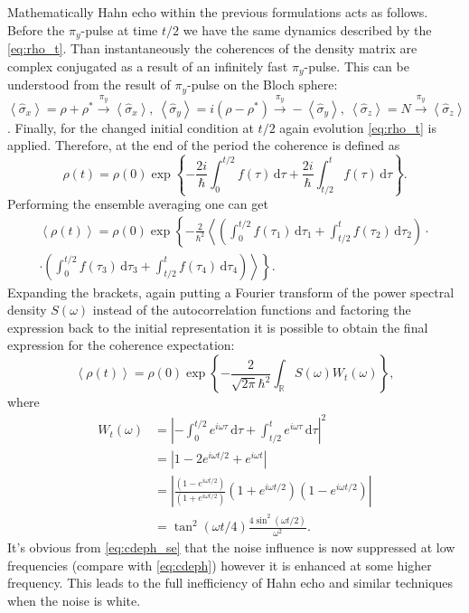\documentclass[12pt]{report}
\newcommand{\diff}{\,\mathrm{d}}
\numberwithin{equation}{section}
\begin{document}
Mathematically Hahn echo within the previous formulations acts as follows. Before the  $\pi_y$-pulse at time $t/2$ we have the same dynamics described by the \eqref{eq:rho_t}. Than instantaneously the coherences of the density matrix are complex conjugated as a result of an infinitely fast $\pi_y$-pulse. This can be understood from the result of $\pi_y$-pulse on the Bloch sphere: $\left< \hat \sigma_x \right> = \rho + \rho^* \overset{\pi_y}{\rightarrow}  \left< \hat \sigma_x \right>,\ \left< \hat \sigma_y \right> = i(\rho - \rho^*) \overset{\pi_y}{\rightarrow} -\left< \hat \sigma_y \right>,\ \left< \hat \sigma_z \right> = N  \overset{\pi_y}{\rightarrow}  \left< \hat \sigma_z \right>$. Finally, for the changed initial condition at $t/2$ again evolution \eqref{eq:rho_t} is applied. Therefore, at the end of the period the coherence is defined as
\begin{equation*}
\rho(t) = \rho(0)\exp \left\{ - \frac{2i}{\hbar}\int_0^{t/2} f(\tau)  \diff \tau + \frac{2i}{\hbar}\int_{t/2}^{t} f(\tau)  \diff \tau \right\}.
\end{equation*}
Performing the ensemble averaging one can get
\begin{gather*}
\left<\rho(t)\right> = \rho(0)\exp \left\{ - \frac{2}{\hbar^2} \left< \left( \int_0^{t/2} f(\tau_1)  \diff \tau_1 + \int_{t/2}^{t} f(\tau_2)  \diff \tau_2 \right)\cdot \right. \right. \\
\cdot \left. \left. \left( \int_0^{t/2} f(\tau_3)  \diff \tau_3 + \int_{t/2}^{t} f(\tau_4)  \diff \tau_4 \right) \right> \right\}.
\end{gather*}
Expanding the brackets, again putting a Fourier transform of the power spectral density $S(\omega)$ instead of the autocorrelation functions and factoring the expression back to the initial representation it is possible to obtain\cite{Preskill} the final expression for the coherence expectation:
\begin{equation}
\left<\rho(t)\right> = \rho(0)\exp \left\{ - \frac{2}{\sqrt{2\pi} \hbar^2} \int_\mathbb{R} S(\omega) W_t (\omega) \right\},
\label{eq:cdeph_se}
\end{equation}
where
\begin{align*}
 W_t (\omega)  &= \left| - \int_0^{t/2} e^{i \omega \tau}\diff \tau + \int_{t/2}^{t} e^{i\omega\tau}  \diff \tau  \right|^2 \\
& =  \left| 1-2e^{i\omega t/2} + e^{i\omega t} \right| \\
&= \left| \frac{(1-e^{i\omega t/2})}{(1+e^{i\omega t/2})} (1+e^{i\omega t/2})(1-e^{i\omega t/2})\right|\\
& = \tan^2(\omega t/4)\frac{4 \sin^2(\omega t/2)}{\omega^2}.
\end{align*}
It's obvious from \eqref{eq:cdeph_se}  that the noise influence is now suppressed at low frequencies (compare with \eqref{eq:cdeph}) however it is enhanced at some higher frequency. This leads to the full inefficiency of Hahn echo and similar techniques when the noise is white.
\end{document}
